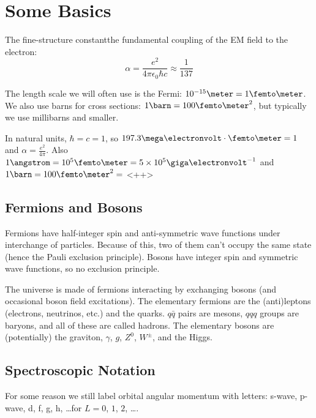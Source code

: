 \documentclass[a4paper,twoside,master.tex]{subfiles}
\begin{document}

\section{Some Basics}
\label{sec:some_basics}

The fine-structure constant\textemdash the fundamental coupling of the EM field to the electron:
\begin{equation}
    \alpha = \frac{e^2}{4 \pi \epsilon_0 \hbar c} \approx \frac{1}{137}
\end{equation}

The length scale we will often use is the Fermi: $ 10^{-15} \meter = 1\femto\meter $. We also use barns for cross sections: $ 1\barn = 100\femto\meter^2 $, but typically we use millibarns and smaller.

In natural units, $ \hbar = c = 1 $, so $ 197.3\mega\electronvolt \cdot \femto\meter = 1 $ and $ \alpha = \frac{e^2}{4 \pi} $. Also $ 1\angstrom = 10^5\femto\meter = 5 \times 10^5\giga\electronvolt^{-1} $ and $ 1\barn = 100\femto\meter^2 =  $ <++>

\subsection{Fermions and Bosons}
\label{sub:fermions_and_bosons}

Fermions have half-integer spin and anti-symmetric wave functions under interchange of particles. Because of this, two of them can't occupy the same state (hence the Pauli exclusion principle). Bosons have integer spin and symmetric wave functions, so no exclusion principle.

The universe is made of fermions interacting by exchanging bosons (and occasional boson field excitations). The elementary fermions are the (anti)leptons (electrons, neutrinos, etc.) and the quarks. $ q \bar{q} $ pairs are mesons, $ qqq $ groups are baryons, and all of these are called hadrons. The elementary bosons are (potentially) the graviton, $ \gamma $, $ g $, $ Z^0 $, $ W^{\pm} $, and the Higgs.

\subsection{Spectroscopic Notation}
\label{sub:spectroscopic_notation}

For some reason we still label orbital angular momentum with letters: s-wave, p-wave, d, f, g, h, \ldots for $ L = 0 $, $ 1 $, $ 2 $, \ldots.
\end{document}
